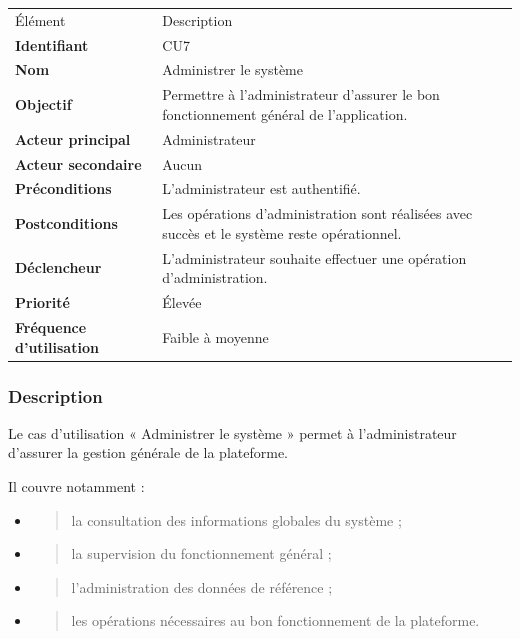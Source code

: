\documentclass[
]{article}
\begin{document}
\begin{longtable}[]{@{}ll@{}}
\toprule
\endhead
Élément & Description \\
\textbf{Identifiant} & CU7 \\
\textbf{Nom} & Administrer le système \\
\textbf{Objectif} & Permettre à l'administrateur d'assurer le bon
fonctionnement général de l'application. \\
\textbf{Acteur principal} & Administrateur \\
\textbf{Acteur secondaire} & Aucun \\
\textbf{Préconditions} & L'administrateur est authentifié. \\
\textbf{Postconditions} & Les opérations d'administration sont réalisées
avec succès et le système reste opérationnel. \\
\textbf{Déclencheur} & L'administrateur souhaite effectuer une opération
d'administration. \\
\textbf{Priorité} & Élevée \\
\textbf{Fréquence d'utilisation} & Faible à moyenne \\
\bottomrule
\end{longtable}

\hypertarget{description-5}{%
\subsubsection{Description}\label{description-5}}

Le cas d'utilisation « Administrer le système » permet à
l'administrateur d'assurer la gestion générale de la plateforme.

Il couvre notamment :

\begin{itemize}
\item
  \begin{quote}
  la consultation des informations globales du système ;
  \end{quote}
\item
  \begin{quote}
  la supervision du fonctionnement général ;
  \end{quote}
\item
  \begin{quote}
  l'administration des données de référence ;
  \end{quote}
\item
  \begin{quote}
  les opérations nécessaires au bon fonctionnement de la plateforme.
  \end{quote}
\end{itemize}
\end{document}
